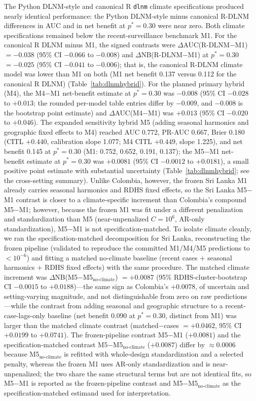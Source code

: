 \documentclass[11pt,a4paper]{article}
\begin{document}
The Python DLNM-style and canonical R \texttt{dlnm} climate specifications produced nearly identical performance: the Python DLNM-style minus canonical R-DLNM differences in AUC and in net benefit at $p^*=0.30$ were near zero. Both climate specifications remained below the recent-surveillance benchmark M1. For the canonical R DLNM minus M1, the signed contrasts were $\Delta$AUC(R\nobreakdash-DLNM$-$M1) $=-0.038$ (95\% CI $-0.066$ to $-0.008$) and $\Delta$NB(R\nobreakdash-DLNM$-$M1) at $p^*=0.30$ $=-0.025$ (95\% CI $-0.041$ to $-0.006$); that is, the canonical R-DLNM climate model was lower than M1 on both (M1 net benefit 0.137 versus 0.112 for the canonical R DLNM) (Table~\ref{tab:dlnmhybrid}). For the planned primary hybrid (M4), the M4$-$M1 net-benefit estimate at $p^*=0.30$ was $-0.008$ (95\% CI $-0.028$ to $+0.013$; the rounded per-model table entries differ by $-0.009$, and $-0.008$ is the bootstrap point estimate) and $\Delta$AUC(M4$-$M1) was $+0.013$ (95\% CI $-0.020$ to $+0.046$). The expanded sensitivity hybrid M5 (adding seasonal harmonics and geographic fixed effects to M4) reached AUC 0.772, PR-AUC 0.667, Brier 0.180 (CITL $+0.440$, calibration slope 1.077; M4 CITL $+0.449$, slope 1.225), and net benefit 0.145 at $p^*=0.30$ (M1: 0.752, 0.652, 0.191, 0.137); the M5$-$M1 net-benefit estimate at $p^*=0.30$ was $+0.0081$ (95\% CI $-0.0012$ to $+0.0181$), a small positive point estimate with substantial uncertainty (Table~\ref{tab:dlnmhybrid}; see the cross-setting summary). Unlike Colombia, however, the frozen Sri Lanka M1 already carries seasonal harmonics and RDHS fixed effects, so the Sri Lanka M5$-$M1 contrast is closer to a climate-specific increment than Colombia's compound M5$-$M1; however, because the frozen M1 was fit under a different penalization and standardization than M5 (near-unpenalized $C{=}10^{6}$, AR-only standardization), M5$-$M1 is not specification-matched. To isolate climate cleanly, we ran the specification-matched decomposition for Sri Lanka, reconstructing the frozen pipeline (validated to reproduce the committed M1/M4/M5 predictions to $<10^{-6}$) and fitting a matched no-climate baseline (recent cases $+$ seasonal harmonics $+$ RDHS fixed effects) with the same procedure. The matched climate increment was $\Delta$NB(M5$-$M5$_{\text{no-climate}}$) $=+0.0087$ (95\% RDHS-cluster-bootstrap CI $-0.0015$ to $+0.0188$)---the same sign as Colombia's $+0.0078$, of uncertain and setting-varying magnitude, and not distinguishable from zero on raw predictions---while the contrast from adding seasonal and geographic structure to a recent-case-lags-only baseline (net benefit $0.090$ at $p^*=0.30$, distinct from M1) was larger than the matched climate contrast (matched$-$cases $=+0.0462$, 95\% CI $+0.0199$ to $+0.0741$). The frozen-pipeline contrast M5$-$M1 ($+0.0081$) and the specification-matched contrast M5$-$M5$_{\text{no-climate}}$ ($+0.0087$) differ by $\approx0.0006$ because M5$_{\text{no-climate}}$ is refitted with whole-design standardization and a selected penalty, whereas the frozen M1 uses AR-only standardization and is near-unpenalized; the two share the same structural terms but are not identical fits, so M5$-$M1 is reported as the frozen-pipeline contrast and M5$-$M5$_{\text{no-climate}}$ as the specification-matched estimand used for interpretation.
\end{document}
